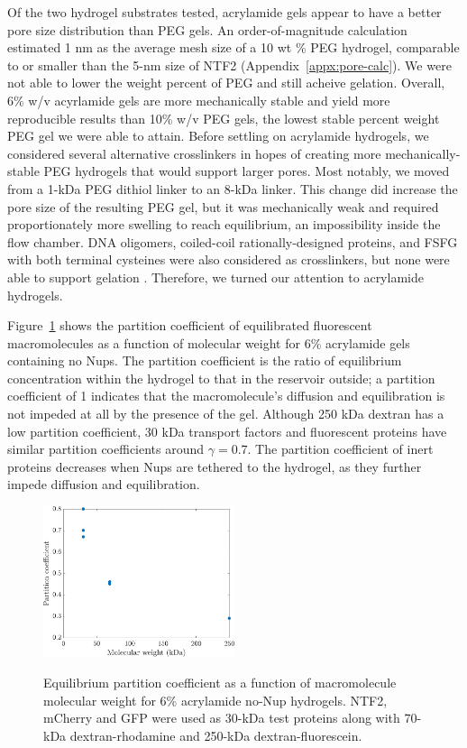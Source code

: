 Of the two hydrogel substrates tested, acrylamide gels appear to have a better pore size distribution than PEG gels.  An order-of-magnitude calculation estimated 1 nm as the average mesh size of a 10 wt \% PEG hydrogel, comparable to or smaller than the 5-nm size of NTF2 (Appendix~\ref{appx:pore-calc}).  We were not able to lower the weight percent of PEG and still acheive gelation.  Overall, 6\% w/v acyrlamide gels are more mechanically stable and yield more reproducible results than 10\% w/v PEG gels, the lowest stable percent weight PEG gel we were able to attain. Before settling on acrylamide hydrogels, we considered several alternative crosslinkers in hopes of creating more mechanically-stable PEG hydrogels that would support larger pores.  Most notably, we moved from a 1-kDa PEG dithiol linker to an 8-kDa linker.  This change did increase the pore size of the resulting PEG gel, but it was mechanically weak and required proportionately more swelling to reach equilibrium, an impossibility inside the flow chamber.  DNA oligomers, coiled-coil rationally-designed proteins, and FSFG with both terminal cysteines were also considered as crosslinkers, but none were able to support gelation \cite{brunette15,huang14}.  Therefore, we turned our attention to acrylamide hydrogels.

Figure~\ref{fig:pc-vs-mw} shows the partition coefficient of equilibrated fluorescent macromolecules as a function of molecular weight for 6\% acrylamide gels containing no Nups.  The partition coefficient is the ratio of equilibrium concentration within the hydrogel to that in the reservoir outside; a partition coefficient of 1 indicates that the macromolecule's diffusion and equilibration is not impeded at all by the presence of the gel.  Although 250 kDa dextran has a low partition coefficient, 30 kDa transport factors and fluorescent proteins have similar partition coefficients around $\gamma = 0.7$.  The partition coefficient of inert proteins decreases when Nups are tethered to the hydrogel, as they further impede diffusion and equilibration.  

\begin{figure}
\caption{Equilibrium partition coefficient as a function of macromolecule molecular weight for 6\% acrylamide no-Nup hydrogels.  NTF2, mCherry and GFP were used as 30-kDa test proteins along with 70-kDa dextran-rhodamine and 250-kDa dextran-fluorescein.\\}
\centering
\includegraphics[width=0.5\textwidth]{figs/ch03/partition-coefficient-vs-mw}
\label{fig:pc-vs-mw}
\end{figure} 

